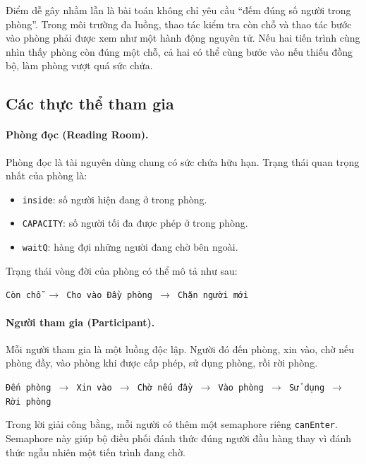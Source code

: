 Điểm dễ gây nhầm lẫn là bài toán không chỉ yêu cầu ``đếm đúng số người
trong phòng''. Trong môi trường đa luồng, thao tác kiểm tra còn chỗ và
thao tác bước vào phòng phải được xem như một hành động nguyên tử. Nếu
hai tiến trình cùng nhìn thấy phòng còn đúng một chỗ, cả hai có thể cùng
bước vào nếu thiếu đồng bộ, làm phòng vượt quá sức chứa.

\subsection{Các thực thể tham gia}

\paragraph{Phòng đọc (Reading Room).}

Phòng đọc là tài nguyên dùng chung có sức chứa hữu hạn. Trạng thái quan
trọng nhất của phòng là:

\begin{itemize}
    \item \texttt{inside}: số người hiện đang ở trong phòng.
    \item \texttt{CAPACITY}: số người tối đa được phép ở trong phòng.
    \item \texttt{waitQ}: hàng đợi những người đang chờ bên ngoài.
\end{itemize}

Trạng thái vòng đời của phòng có thể mô tả như sau:

\begin{center}
\texttt{Còn chỗ $\rightarrow$ Cho vào \qquad Đầy phòng $\rightarrow$ Chặn người mới}
\end{center}

\paragraph{Người tham gia (Participant).}

Mỗi người tham gia là một luồng độc lập. Người đó đến phòng, xin vào,
chờ nếu phòng đầy, vào phòng khi được cấp phép, sử dụng phòng, rồi rời
phòng.

\begin{center}
\texttt{Đến phòng $\rightarrow$ Xin vào $\rightarrow$ Chờ nếu đầy
$\rightarrow$ Vào phòng $\rightarrow$ Sử dụng $\rightarrow$ Rời phòng}
\end{center}

Trong lời giải công bằng, mỗi người có thêm một semaphore riêng
\texttt{canEnter}. Semaphore này giúp bộ điều phối đánh thức đúng người
đầu hàng thay vì đánh thức ngẫu nhiên một tiến trình đang chờ.

